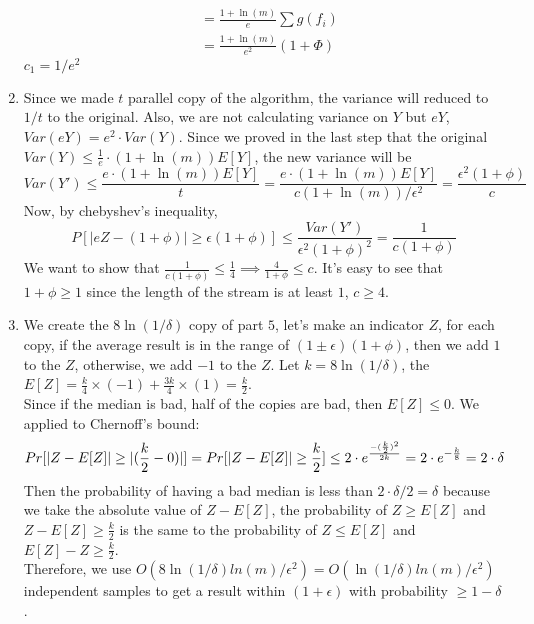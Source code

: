 \documentclass[11pt]{article}
\begin{document}
\begin{solution}
\begin{enumerate}
\begin{align*}
        &= \frac{1 + \ln(m)}{e} \sum g(f_i) \\
        &= \frac{1 + \ln(m)}{e^2} (1 + \Phi)
    \end{align*}
    $c_1 = 1/e^2$
    \item Since we made $t$ parallel copy of the algorithm, the variance will reduced to $1/t$ to the original. Also, we are not calculating variance on $Y$ but $eY$, $Var(eY) = e^2\cdot Var(Y)$. Since we proved in the last step that the original $Var(Y)\leq \frac{1}{e}\cdot (1+ \ln(m))E[Y]$, the new variance will be 
    $$Var(Y') \leq \frac{e\cdot (1+ \ln(m))E[Y]}{t} = \frac{e\cdot (1+ \ln(m))E[Y]}{c(1+ \ln(m))/\epsilon^2} = \frac{\epsilon^2(1+\phi)}{c}$$
    Now, by chebyshev's inequality,
    $$ P[|eZ - (1+\phi)|\geq \epsilon(1+\phi)] \leq \frac{Var(Y')}{\epsilon^2(1+\phi)^2} = \frac{1}{c(1+\phi)}$$
    We want to show that $\frac{1}{c(1+\phi)} \leq \frac{1}{4} \implies \frac{4}{1+\phi}\leq c$. It's easy to see that $1+\phi \geq 1$ since the length of the stream is at least $1$, $c \geq 4$.
    \item We create the $8\ln(1/\delta)$ copy of part $5$, let's make an indicator $Z$, for each copy, if the average result is in the range of $(1\pm \epsilon)(1 + \phi)$, then we add $1$ to the $Z$, otherwise, we add $-1$ to the $Z$. Let $k = 8\ln(1/\delta)$, the $E[Z] = \frac{k}{4}\times(-1) + \frac{3k}{4}\times(1) = \frac{k}{2}$.\\
    Since if the median is bad, half of the copies are bad, then $E[Z] \leq 0$. We applied to Chernoff's bound:\\
    $$Pr[|Z-E[Z]| \geq \mathopen| (\frac{k}{2} - 0) \mathclose|] = Pr[|Z-E[Z]| \geq \frac{k}{2}] \leq 2\cdot e^{\frac{-(\frac{k}{2})^2}{2k}} = 2\cdot e^{-\frac{k}{8}} = 2 \cdot \delta$$
    Then the probability of having a bad median is less than $2 \cdot \delta /2 = \delta$ because we take the absolute value of $Z-E[Z]$, the probability of $Z \geq E[Z]$ and $Z - E[Z] \geq \frac{k}{2}$ is the same to the probability of $Z \leq E[Z]$ and $ E[Z] - Z \geq \frac{k}{2}$.\\ Therefore, we use $O(8\ln(1/\delta)ln(m)/\epsilon^2) = O(\ln(1/\delta)ln(m)/\epsilon^2)$ independent samples to get a result within $(1+\epsilon)$ with probability $\geq 1-\delta$.
    \end{enumerate}

\end{solution}
\end{document}
